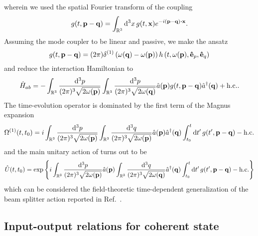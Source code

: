 wherein we used the spatial Fourier transform of the coupling
\begin{equation}
	g(t,\vb{p}-\vb{q})
	=
	\int_{\mathbb{R}^3}\dd[3]{x}
	g(t,\vb{x})
	e^{-i(\vb{p}-\vb{q})\vdot\vb{x}}
	.
\end{equation}
Assuming the mode coupler to be linear and passive, we make the ansatz
\begin{equation}
	g(t,\vb{p}-\vb{q})
	=
	(2\pi)
	\delta^{(1)}\left(\omega(\vb{q})-\omega(\vb{p})\right)
	h\left(t,\omega(\vb{p}),\vu{e}_p,\vu{e}_q\right)
\end{equation}
and reduce the interaction Hamiltonian to
\begin{equation}
	\hat{H}_{ab}
	=
	-
	\int_{\mathbb{R}^3}
	\frac{\dd[3]{p}}{(2\pi)^3\sqrt{2\omega(\vb{p})}}
	\int_{\mathbb{R}^3}
	\frac{\dd[3]{p}}{(2\pi)^3\sqrt{2\omega(\vb{q})}}
	\hat{a}(\vb{p})
	g(t,\vb{p}-\vb{q})
	\hat{a}^\dagger(\vb{q})
	+
	\text{h.c.}
	.
\end{equation}
The time-evolution operator is dominated by the first term of the Magnus expansion
\begin{equation}
	\Omega^{(1)}(t,t_0)
	=
	i
	\int_{\mathbb{R}^3}
	\frac{\dd[3]{p}}{(2\pi)^3\sqrt{2\omega(\vb{p})}}
	\int_{\mathbb{R}^3}
	\frac{\dd[3]{q}}{(2\pi)^3\sqrt{2\omega(\vb{p})}}
	\hat{a}(\vb{p})
	\hat{a}^\dagger(\vb{q})
	\int_{t_0}^t
	\dd{t^\prime}
	g(t^\prime,\vb{p}-\vb{q})
	-
	\text{h.c.}
\end{equation}
and the main unitary action of turns out to be
\begin{equation}
	\hat{U}(t,t_0)
	=
	\exp\left\{
		i
		\int_{\mathbb{R}^3}
		\frac{\dd[3]{p}}{(2\pi)^3\sqrt{2\omega(\vb{p})}}
		\hat{a}(\vb{p})
		\int_{\mathbb{R}^3}
		\frac{\dd[3]{q}}{(2\pi)^3\sqrt{2\omega(\vb{q})}}
		\hat{a}^\dagger(\vb{q})
		\int_{t_0}^t
		\dd{t^\prime}
		g(t^\prime,\vb{p}-\vb{q})
		-
		\text{h.c.}
	\right\}
\end{equation}
which can be considered the field-theoretic time-dependent generalization of the beam splitter action reported in Ref.~\cite{Leonhardt2003,Haroche2006}.

\FloatBarrier
\subsection{Input-output relations for coherent state}